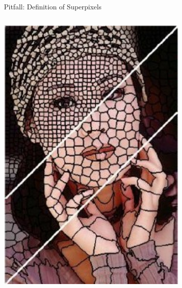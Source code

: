 \documentclass[11pt,compress,t,notes=noshow, aspectratio=169, xcolor=table]{beamer}
\begin{document}
\begin{frame}{Pitfall: Definition of Superpixels }
\begin{columns}
\begin{column}{0.4\textwidth}
        \centering
        \includegraphics[width=0.7\textwidth]{figure/superpixel_woman}
        
    \end{column}
    
\end{columns}

\end{frame}


\endlecture
\end{document}
